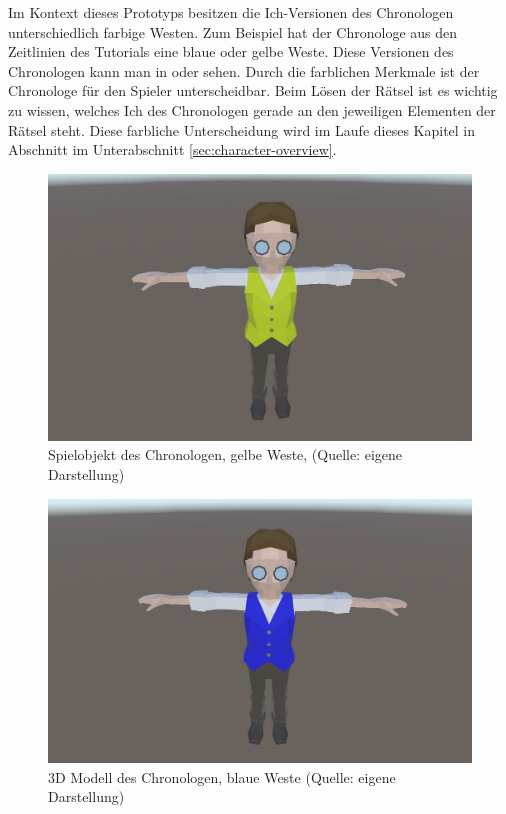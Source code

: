 Im Kontext dieses Prototyps besitzen die Ich-Versionen des Chronologen unterschiedlich farbige Westen. Zum Beispiel hat der Chronologe aus den Zeitlinien des Tutorials eine blaue oder gelbe Weste. Diese Versionen des Chronologen kann man in  oder  sehen. Durch die farblichen Merkmale ist der Chronologe für den Spieler unterscheidbar. Beim Lösen der Rätsel ist es wichtig zu wissen, welches Ich des Chronologen gerade an den jeweiligen Elementen der Rätsel steht. Diese farbliche Unterscheidung wird im Laufe dieses Kapitel in Abschnitt  im Unterabschnitt \ref{sec:character-overview}.

\begin{figure}[ht]
\centering
\includegraphics[width=0.8\linewidth]{content/pictures/Chronologe_y.jpg}
\caption{Spielobjekt des Chronologen, gelbe Weste, (Quelle: eigene Darstellung)}
\label{fig:chronologe_y}
\end{figure}

\begin{figure}[ht]
\centering
\includegraphics[width=0.8\linewidth]{content/pictures/Chronologe_b.jpg}
\caption{3D Modell des Chronologen, blaue Weste (Quelle: eigene Darstellung)}
\label{fig:chronologe_b}
\end{figure}

